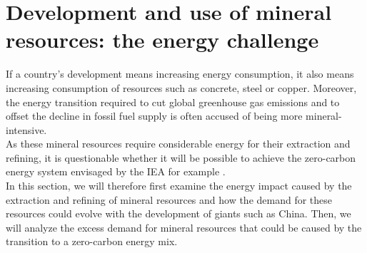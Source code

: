 \documentclass[conference]{IEEEtran}
\begin{document}
\section{Development and use of mineral resources: the energy challenge}
If a country's development means increasing energy consumption, it also means increasing consumption of resources such as concrete, steel or copper. Moreover, the energy transition required to cut global greenhouse gas emissions and to offset the decline in fossil fuel supply is often accused of being more mineral-intensive. 
\\
As these mineral resources require considerable energy for their extraction and refining, it is questionable whether it will be possible to achieve the zero-carbon energy system envisaged by the IEA for example \cite{noauthor_net_2021}. 
\\
In this section, we will therefore first examine the energy impact caused by the extraction and refining of mineral resources and how the demand for these resources could evolve with the development of giants such as China. 
Then, we will analyze the excess demand for mineral resources that could be caused by the transition to a zero-carbon energy mix. 
\end{document}
